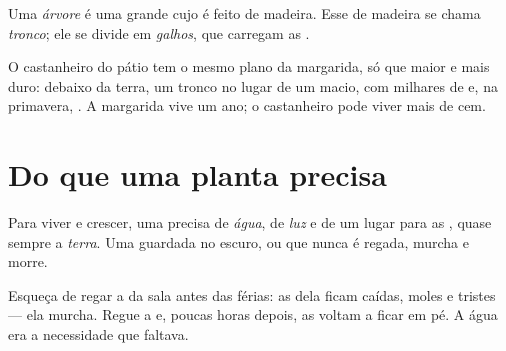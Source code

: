 \begin{definition}[Árvore]\label{def:g1:plants-around-us:tree}
Uma \emph{árvore} é uma  grande cujo  é
feito de madeira. Esse  de madeira se chama
\emph{tronco}; ele se divide em
\emph{galhos}, que carregam as .
\end{definition}

\begin{example}[O castanheiro]\label{ex:g1:plants-around-us:tree}
O castanheiro do pátio tem o mesmo plano da margarida, só que maior
e mais duro:  debaixo da terra, um tronco no lugar de um 
macio,  com milhares de  e, na primavera, . A
margarida vive um ano; o castanheiro pode viver mais de cem.
\end{example}

\section{Do que uma planta precisa}

\begin{proposition}\label{prop:g1:plants-around-us:needs}
Para viver e crescer, uma  precisa de \emph{água}, de
\emph{luz} e de um lugar para as , quase sempre a
\emph{terra}. Uma  guardada no escuro, ou que
nunca é regada, murcha e morre.
\end{proposition}
\admitted

\begin{example}\label{ex:g1:plants-around-us:wilt}
Esqueça de regar a  da sala antes das férias: as  dela
ficam caídas, moles e tristes --- ela murcha. Regue a  e,
poucas horas depois, as  voltam a ficar em pé. A água era a
necessidade que faltava.
\end{example}

